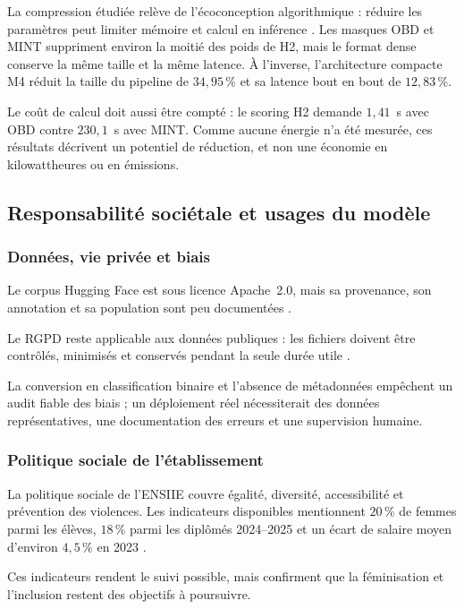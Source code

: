 La compression étudiée relève de l'écoconception algorithmique : réduire les
paramètres peut limiter mémoire et calcul en inférence
\cite{arcepIAEnvironnement2026}. Les masques OBD et MINT suppriment environ la
moitié des poids de H2, mais le format dense conserve la même taille et la même
latence. À l'inverse, l'architecture compacte M4 réduit la taille du pipeline de
$34{,}95\,\%$ et sa latence bout en bout de $12{,}83\,\%$.

Le coût de calcul doit aussi être compté : le scoring H2 demande $1{,}41$~s avec
OBD contre $230{,}1$~s avec MINT. Comme aucune énergie n'a été mesurée, ces
résultats décrivent un potentiel de réduction, et non une économie en
kilowattheures ou en émissions.

\subsection{Responsabilité sociétale et usages du modèle}
\label{ssec:ddrs_responsabilite}

\subsubsection{Données, vie privée et biais}

Le corpus Hugging Face est sous licence Apache~2.0, mais sa provenance, son
annotation et sa population sont peu documentées
\cite{huggingfaceSentiment2023}.

Le RGPD reste applicable aux données publiques : les fichiers doivent être
contrôlés, minimisés et conservés pendant la seule durée utile
\cite{cnilDonneesInternet2024}.

La conversion en classification binaire et l'absence de métadonnées empêchent
un audit fiable des biais ; un déploiement réel nécessiterait des données
représentatives, une documentation des erreurs et une supervision humaine.

\subsubsection{Politique sociale de l'établissement}

La politique sociale de l'ENSIIE couvre égalité, diversité, accessibilité et
prévention des violences. Les indicateurs disponibles mentionnent $20\,\%$ de
femmes parmi les élèves, $18\,\%$ parmi les diplômés 2024--2025 et un écart de
salaire moyen d'environ $4{,}5\,\%$ en 2023
\cite{ensiieIndicateursDDRS2026}.

Ces indicateurs rendent le suivi possible, mais confirment que la féminisation
et l'inclusion restent des objectifs à poursuivre.

